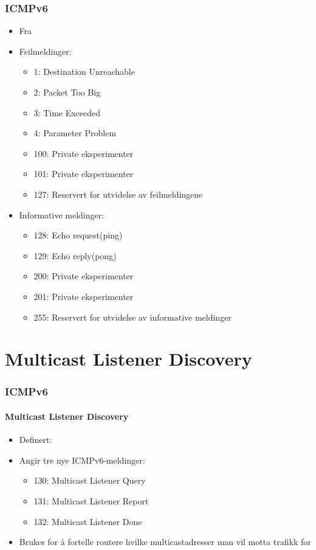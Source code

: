 \begin{frame}%
  \frametitle{ICMPv6}
  \begin{itemize}[<+->]
  \item Fra 
  \item Feilmeldinger:
    \begin{itemize}[<+->]
    \item 1: Destination Unreachable
    \item 2: Packet Too Big
    \item 3: Time Exceeded
    \item 4: Parameter Problem
    \item 100: Private eksperimenter
    \item 101: Private eksperimenter
    \item 127: Reservert for utvidelse av feilmeldingene
    \end{itemize}
  \item Informative meldinger:
    \begin{itemize}[<+->]
    \item 128: Echo request\hfill(ping)
    \item 129: Echo reply\hfill(pong)
    \item 200: Private eksperimenter
    \item 201: Private eksperimenter
    \item 255: Reservert for utvidelse av informative meldinger
    \end{itemize}
  \end{itemize}
\end{frame}

\section{Multicast Listener Discovery}
\begin{frame}%
  \frametitle{ICMPv6}
  \framesubtitle{Multicast Listener Discovery}
  \begin{itemize}%
  \item Definert: 
  \item Angir tre nye ICMPv6-meldinger:
    \begin{itemize}%
    \item 130: Multicast Listener Query
    \item 131: Multicast Listener Report
    \item 132: Multicast Listener Done
    \end{itemize}
  \item Brukes for å fortelle routere hvilke multicastadresser man vil
    motta trafikk for
  \end{itemize}
\end{frame}

